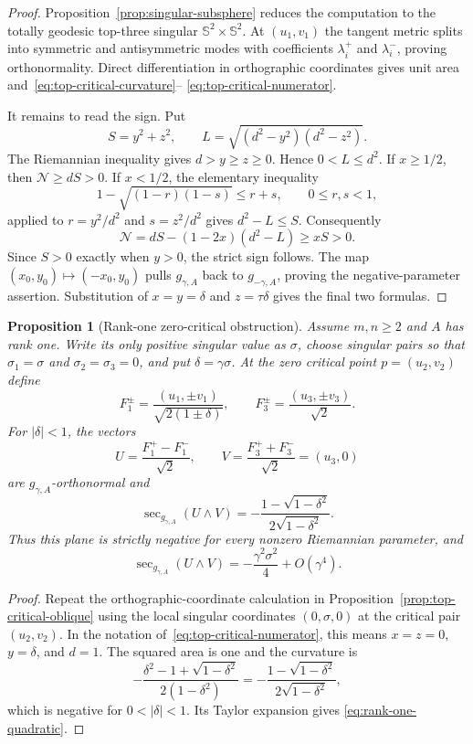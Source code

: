 \documentclass[11pt]{amsart}
\newtheorem{proposition}[theorem]{Proposition}
\theoremstyle{definition}
\theoremstyle{remark}
\DeclareMathOperator{\secop}{sec}
\newcommand{\Sph}{\mathbb S}
\begin{document}
\begin{proof}
Proposition~\ref{prop:singular-subsphere} reduces the computation to
the totally geodesic top-three singular
$\Sph^2\times\Sph^2$.  At $(u_1,v_1)$ the tangent metric splits into
symmetric and antisymmetric modes with coefficients
$\lambda_i^+$ and $\lambda_i^-$, proving orthonormality.
Direct differentiation in orthographic coordinates gives unit area
and~\eqref{eq:top-critical-curvature}--
\eqref{eq:top-critical-numerator}.

It remains to read the sign.  Put
\[
 S=y^2+z^2,
 \qquad L=\sqrt{(d^2-y^2)(d^2-z^2)}.
\]
The Riemannian inequality gives $d>y\geq z\geq0$.  Hence
$0<L\leq d^2$.  If $x\geq1/2$, then
$\mathcal N\geq dS>0$.  If $x<1/2$, the elementary inequality
\[
 1-\sqrt{(1-r)(1-s)}\leq r+s,
 \qquad 0\leq r,s<1,
\]
applied to $r=y^2/d^2$ and $s=z^2/d^2$ gives
$d^2-L\leq S$.  Consequently
\[
 \mathcal N=dS-(1-2x)(d^2-L)\geq xS>0.
\]
Since $S>0$ exactly when $y>0$, the strict sign follows.  The map
$(x_0,y_0)\mapsto(-x_0,y_0)$ pulls $g_{\gamma,A}$ back to
$g_{-\gamma,A}$, proving the negative-parameter assertion.
Substitution of $x=y=\delta$ and $z=\tau\delta$ gives the final two
formulas.
\end{proof}

\begin{proposition}[Rank-one zero-critical obstruction]
\label{prop:rank-one-oblique}
Assume $m,n\geq2$ and $A$ has rank one.  Write its only positive
singular value as $\sigma$, choose singular pairs so that
$\sigma_1=\sigma$ and $\sigma_2=\sigma_3=0$, and put
$\delta=\gamma\sigma$.  At the zero critical point
$p=(u_2,v_2)$ define
\[
 F_1^\pm=\frac{(u_1,\pm v_1)}{\sqrt{2(1\pm\delta)}},
 \qquad
 F_3^\pm=\frac{(u_3,\pm v_3)}{\sqrt2}.
\]
For $|\delta|<1$, the vectors
\[
 U=\frac{F_1^+-F_1^-}{\sqrt2},
 \qquad
 V=\frac{F_3^++F_3^-}{\sqrt2}=(u_3,0)
\]
are $g_{\gamma,A}$-orthonormal and
\begin{equation}\label{eq:rank-one-oblique}
 \secop_{g_{\gamma,A}}(U\wedge V)
 =-\frac{1-\sqrt{1-\delta^2}}
          {2\sqrt{1-\delta^2}}.
\end{equation}
Thus this plane is strictly negative for every nonzero Riemannian
parameter, and
\begin{equation}\label{eq:rank-one-quadratic}
 \secop_{g_{\gamma,A}}(U\wedge V)
 =-\frac{\gamma^2\sigma^2}{4}+O(\gamma^4).
\end{equation}
\end{proposition}

\begin{proof}
Repeat the orthographic-coordinate calculation in
Proposition~\ref{prop:top-critical-oblique} using the local singular
coordinates $(0,\sigma,0)$ at the critical pair $(u_2,v_2)$.
In the notation of~\eqref{eq:top-critical-numerator}, this means
$x=z=0$, $y=\delta$, and $d=1$.  The squared area is one and the
curvature is
\[
 -\frac{\delta^2-1+\sqrt{1-\delta^2}}
        {2(1-\delta^2)}
 =-\frac{1-\sqrt{1-\delta^2}}
        {2\sqrt{1-\delta^2}},
\]
which is negative for $0<|\delta|<1$.  Its Taylor expansion gives
\eqref{eq:rank-one-quadratic}.
\end{proof}
\end{document}
